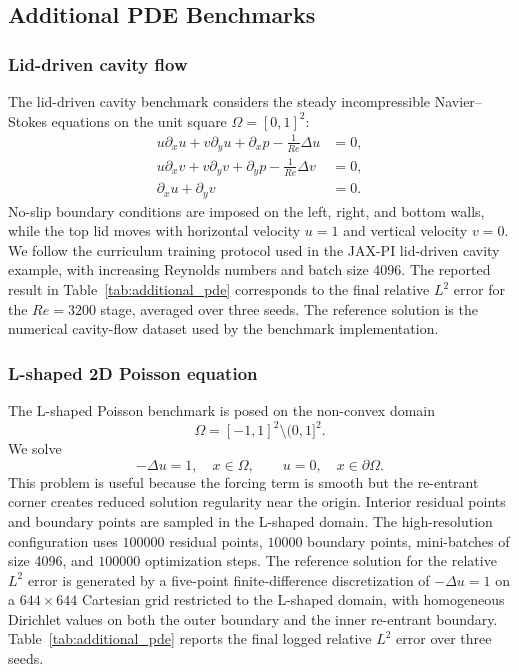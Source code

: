 \documentclass[preprint,12pt]{elsarticle}
\begin{document}
\subsection{Additional PDE Benchmarks}
\label{app:additional_pde_benchmarks}

\subsubsection{Lid-driven cavity flow}

The lid-driven cavity benchmark considers the steady incompressible Navier--Stokes equations on the unit square \(\Omega=[0,1]^2\):
\begin{equation}
\begin{aligned}
  u\partial_x u+v\partial_y u+\partial_x p-\frac{1}{Re}\Delta u &= 0,\\
  u\partial_x v+v\partial_y v+\partial_y p-\frac{1}{Re}\Delta v &= 0,\\
  \partial_x u+\partial_y v &= 0.
\end{aligned}
\end{equation}
No-slip boundary conditions are imposed on the left, right, and bottom walls, while the top lid moves with horizontal velocity \(u=1\) and vertical velocity \(v=0\). We follow the curriculum training protocol used in the JAX-PI lid-driven cavity example, with increasing Reynolds numbers and batch size 4096. The reported result in Table~\ref{tab:additional_pde} corresponds to the final relative \(L^2\) error for the \(Re=3200\) stage, averaged over three seeds. The reference solution is the numerical cavity-flow dataset used by the benchmark implementation.

\subsubsection{L-shaped 2D Poisson equation}

The L-shaped Poisson benchmark is posed on the non-convex domain
\begin{equation}
  \Omega=[-1,1]^2\setminus(0,1]^2.
\end{equation}
We solve
\begin{equation}
  -\Delta u = 1,\quad x\in\Omega,
  \qquad
  u=0,\quad x\in\partial\Omega.
\end{equation}
This problem is useful because the forcing term is smooth but the re-entrant corner creates reduced solution regularity near the origin. Interior residual points and boundary points are sampled in the L-shaped domain. The high-resolution configuration uses \(100000\) residual points, \(10000\) boundary points, mini-batches of size 4096, and \(100000\) optimization steps. The reference solution for the relative \(L^2\) error is generated by a five-point finite-difference discretization of \(-\Delta u=1\) on a \(644\times644\) Cartesian grid restricted to the L-shaped domain, with homogeneous Dirichlet values on both the outer boundary and the inner re-entrant boundary. Table~\ref{tab:additional_pde} reports the final logged relative \(L^2\) error over three seeds.
\end{document}
